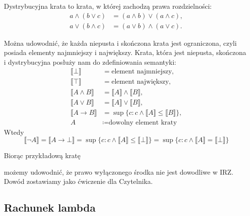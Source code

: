 \documentclass[polish,pretty]{angav}
\begin{document}
Dystrybucyjna krata to krata, w której zachodzą prawa rozdzielności:
\begin{align*}
    a \land (b \lor c) &= (a \land b) \lor (a \land c), \\
    a \lor (b \land c) &= (a \lor b) \land (a \lor c).
\end{align*}

Można udowodnić, że każda niepusta i skończona krata jest ograniczona, czyli posiada elementy najmniejszy i największy. Krata, która jest niepusta, skończona i dystrybucyjna posłuży nam do zdefiniowania semantyki:
\begin{align*}
    \llbracket \bot \rrbracket &= \text{element najmniejszy}, \\
    \llbracket \top \rrbracket &= \text{element największy}, \\
    \llbracket A \land B \rrbracket &= \llbracket A \rrbracket \land \llbracket B \rrbracket, \\
    \llbracket A \lor B \rrbracket &= \llbracket A \rrbracket \lor \llbracket B \rrbracket, \\
    \llbracket A \to B \rrbracket &= \sup\{c : c \land \llbracket A \rrbracket \leq \llbracket B \rrbracket\}, \\
    A &\coloneqq \text{dowolny element kraty}
\end{align*}
Wtedy
\[ \llbracket \neg A \rrbracket = \llbracket A \to \bot \rrbracket = \sup\{c : c \land \llbracket A \rrbracket \leq \llbracket \bot \rrbracket\} = \sup\{c : c \land \llbracket A \rrbracket = \llbracket \bot \rrbracket\} \]

Biorąc przykładową kratę
\begin{figure}[H]
    \centering
\end{figure}
możemy udowodnić, że prawo wyłączonego środka nie jest dowodliwe w IRZ. Dowód zostawiamy jako ćwiczenie dla Czytelnika.

\subsection{Rachunek lambda}
\end{document}
